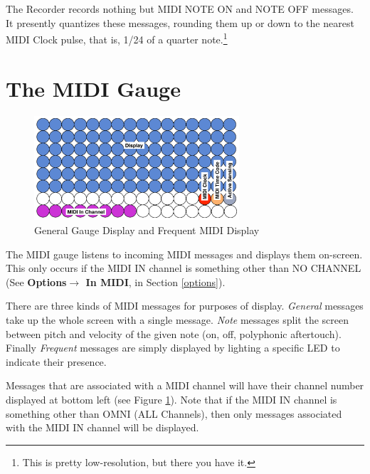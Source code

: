 \documentclass{article}
\begin{document}
The Recorder records nothing but MIDI NOTE ON and NOTE OFF messages.  It presently quantizes these messages, rounding them up or down to the nearest MIDI Clock pulse, that is, 1/24 of a quarter note.\footnote{This is pretty low-resolution, but there you have it.}

\section {The MIDI Gauge}

\begin{figure}
\vspace{-1.5em}\includegraphics[width=3in]{GeneralGauge.pdf}
\vspace{-2em}\caption{\small General Gauge Display and Frequent MIDI Display}\vspace{-1em}
\label{generalgauge}
\end{figure}

The MIDI gauge listens to incoming MIDI messages and displays them on-screen.  This only occurs if the MIDI IN channel is something other than NO CHANNEL (See {\bf Options\(\boldsymbol\rightarrow\) In MIDI}, in Section \ref{options}).

There are three kinds of MIDI messages for purposes of display.  {\it General} messages take up the whole screen with a single message.  {\it Note} messages split the screen between pitch and velocity of the given note (on, off, polyphonic aftertouch).  Finally {\it Frequent} messages are simply displayed by lighting a specific LED to indicate their presence. 

Messages that are associated with a MIDI channel will have their channel number displayed at bottom left (see Figure \ref{generalgauge}).  Note that if the MIDI IN channel is something other than OMNI (ALL Channels), then only messages associated with the MIDI IN channel will be displayed.
\end{document}
